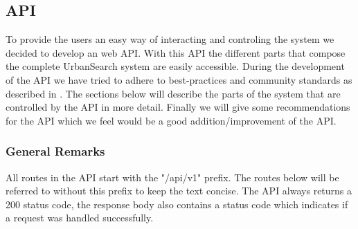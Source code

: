 \subsection{API}
To provide the users an easy way of interacting and controling the system we decided to develop an web API. With this API the different parts that compose the complete UrbanSearch system are easily accessible. During the development of the API we have tried to adhere to best-practices and community standards as described in \cite{apigee}. The sections below will describe the parts of the system that are controlled by the API in more detail. Finally we will give some recommendations for the API which we feel would be a good addition/improvement of the API.

\subsubsection{General Remarks}

All routes in the API start with the "/api/v1" prefix. The routes below will be referred to without this prefix to keep the text concise. The API always returns a 200 status code, the response body also contains a status code which indicates if a request was handled successfully.

